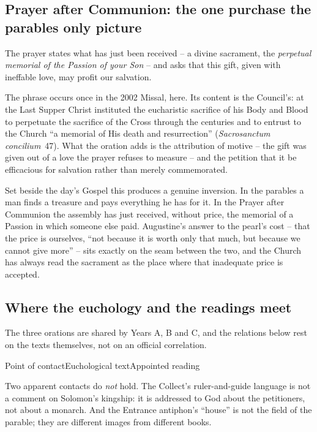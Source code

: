 \subsection*{Prayer after Communion: the one purchase the parables only picture}

The prayer states what has just been received -- a divine sacrament, the \emph{perpetual memorial of the Passion of your Son} -- and asks that this gift, given with ineffable love, may profit our salvation.

The phrase  occurs once in the 2002 Missal, here. Its content is the Council's: at the Last Supper Christ instituted the eucharistic sacrifice of his Body and Blood to perpetuate the sacrifice of the Cross through the centuries and to entrust to the Church ``a memorial of His death and resurrection'' (\emph{Sacrosanctum concilium}~47). What the oration adds is the attribution of motive -- the gift was given out of a love the prayer refuses to measure -- and the petition that it be efficacious for salvation rather than merely commemorated.

Set beside the day's Gospel this produces a genuine inversion. In the parables a man finds a treasure and pays everything he has for it. In the Prayer after Communion the assembly has just received, without price, the memorial of a Passion in which someone else paid. Augustine's answer to the pearl's cost -- that the price is ourselves, ``not because it is worth only that much, but because we cannot give more'' -- sits exactly on the seam between the two, and the Church has always read the sacrament as the place where that inadequate price is accepted.

\subsection*{Where the euchology and the readings meet}

The three orations are shared by Years A, B and C, and the relations below rest on the texts themselves, not on an official correlation.

\begin{threecoltable}{Point of contact}{Euchological text}{Appointed reading}
\end{threecoltable}

Two apparent contacts do \emph{not} hold. The Collect's ruler-and-guide language is not a comment on Solomon's kingship: it is addressed to God about the petitioners, not about a monarch. And the Entrance antiphon's ``house'' is not the field of the parable; they are different images from different books.
